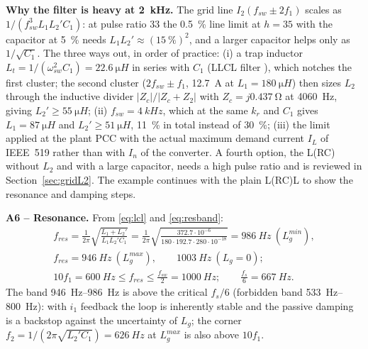 \documentclass[10pt,a4paper]{scrartcl}
\newcommand{\fsw}{f_{sw}}
\newcommand{\wsw}{\omega_{sw}}
\newcommand{\fres}{f_{res}}
\newcommand{\Lg}{L_{g}}
\begin{document}
\begin{onehalfspace}
\begin{mybox}
\textbf{Why the filter is heavy at \SI{2}{kHz}.} The grid line $I_2(\fsw \pm 2f_1)$ scales as $1/(\fsw^3 L_1 L_2' C_1)$: at pulse ratio 33 the \SI{0.5}{\percent} line limit at $h = 35$ with the capacitor at \SI{5}{\percent} needs $L_1 L_2' \approx (\SI{15}{\percent})^2$, and a larger capacitor helps only as $1/\sqrt{C_1}$. The three ways out, in order of practice: (i) a trap inductor $L_t = 1/(\wsw^2 C_1) = \SI{22.6}{\micro H}$ in series with $C_1$ (LLCL filter \cite{wu2012}), which notches the first cluster; the second cluster ($2\fsw \pm f_1$, \SI{12.7}{A} at $L_1 = \SI{180}{\micro H}$) then sizes $L_2$ through the inductive divider $|Z_c|/|Z_c + Z_2|$ with $Z_c = j\SI{0.437}{\ohm}$ at \SI{4060}{Hz}, giving $L_2' \ge \SI{55}{\micro H}$; (ii) $\fsw = \SI{4}{kHz}$, which at the same $k_r$ and $C_1$ gives $L_1 = \SI{87}{\micro H}$ and $L_2' \ge \SI{51}{\micro H}$, \SI{11}{\percent} in total instead of \SI{30}{\percent}; (iii) the limit applied at the plant PCC with the actual maximum demand current $I_L$ of IEEE~519 rather than with $I_n$ of the converter. A fourth option, the L(RC) without $L_2$ and with a large capacitor, needs a high pulse ratio and is reviewed in Section~\ref{sec:gridL2}. The example continues with the plain L(RC)L to show the resonance and damping steps.
\end{mybox}

\textbf{A6 -- Resonance.} From \eqref{eq:lcl} and \eqref{eq:resband}:
\begin{gather*}
\fres = \frac{1}{2\pi}\sqrt{\frac{L_1 + L_2'}{L_1 L_2' C_1}} = \frac{1}{2\pi}\sqrt{\frac{372.7\cdot 10^{-6}}{180 \cdot 192.7 \cdot 280 \cdot 10^{-18}}} = \SI{986}{Hz}\ (\Lg^{min}),\\
\fres = \SI{946}{Hz}\ (\Lg^{max}),\qquad \SI{1003}{Hz}\ (\Lg = 0);\\
10f_1 = \SI{600}{Hz} \le \fres \le \frac{\fsw}{2} = \SI{1000}{Hz};\qquad \frac{f_s}{6} = \SI{667}{Hz}.
\end{gather*}
The band \SIrange{946}{986}{Hz} is above the critical $f_s/6$ (forbidden band \SIrange{533}{800}{Hz}): with $i_1$ feedback the loop is inherently stable \cite{parker2014} and the passive damping is a backstop against the uncertainty of $\Lg$; the corner $f_2 = 1/(2\pi\sqrt{L_2'C_1}) = \SI{626}{Hz}$ at $\Lg^{max}$ is also above $10f_1$.


\end{onehalfspace}
\end{document}
